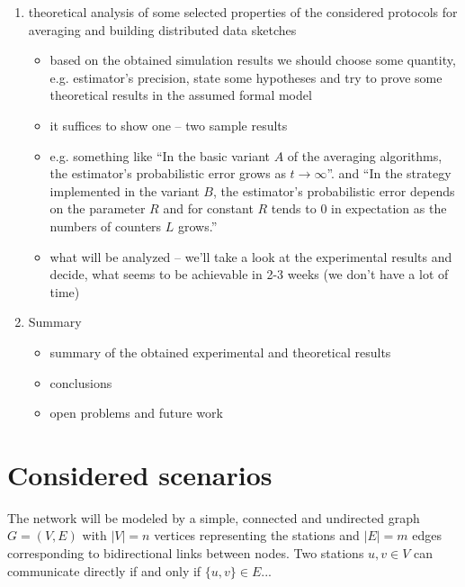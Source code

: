 \documentclass[a4paper, 12pt]{article}
\begin{document}
\begin{enumerate}[label*=\arabic*.]
	 \item theoretical analysis of some selected properties of the considered protocols for averaging and building distributed data sketches 
	 		\begin{itemize}
	 			\item based on the obtained simulation results we should choose some quantity, e.g. estimator's precision, state some hypotheses and
	 					try to prove some theoretical results in the assumed formal model
	 			\item it suffices to show one -- two sample results
	 			\item e.g. something like ``In the basic variant $A$ of the averaging algorithms, the estimator's probabilistic error grows as $t \to \infty$''.
	 				  and ``In the strategy implemented in the variant $B$, the estimator's probabilistic error depends on the parameter $R$ and for constant $R$ tends
	 				  to $0$ in expectation as the numbers of counters $L$ grows.''
	 			\item what will be analyzed -- we'll take a look at the experimental results and decide, what seems to be achievable in 2-3 weeks (we don't have a lot of time)
	 		\end{itemize}
 		
 	\item Summary
 		\begin{itemize}
 			\item summary of the obtained experimental and theoretical results
 			\item conclusions
 			\item open problems and future work
 		\end{itemize}
	 
\end{enumerate}

\section*{Considered scenarios}
The network will be modeled by a simple, connected and undirected graph $G=(V,E)$ with $|V| = n$ vertices representing the stations and $|E| = m$ edges corresponding to
bidirectional links between nodes. Two stations $u, v \in V$ can communicate directly if and only if $\{u,v\} \in E$...
\end{document}
